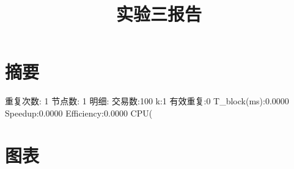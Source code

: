 \documentclass{ctexart}
\title{实验三报告}
\date{}
\begin{document}
\maketitle
\section*{摘要}
重复次数: 1
节点数: 1
明细:
交易数:100 k:1 有效重复:0 T_block(ms):0.0000 Speedup:0.0000 Efficiency:0.0000 CPU(%
\section*{图表}
\end{document}
